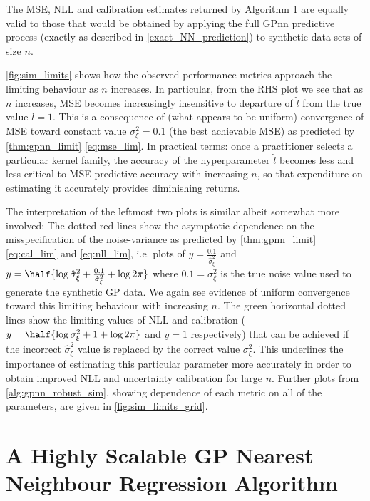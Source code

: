 \begin{lemma}
\label{lem:alg1}
The MSE, NLL and calibration estimates returned by Algorithm 1 are equally valid
to those that would be obtained by applying the full GPnn predictive process (exactly as described in \autoref{exact_NN_prediction}) to synthetic data sets of size $n$. 
\end{lemma}

\autoref{fig:sim_limits} shows how the observed performance metrics approach the limiting behaviour as \(n\) increases. In particular, from the RHS plot we see that as $n$ increases, MSE becomes increasingly insensitive to departure of $\hat{l}$ from the true value $l = 1$. This is a consequence of (what appears to be uniform) convergence of MSE toward constant value $\sigma_\xi^2 = 0.1$ (the best achievable MSE) as predicted by \autoref{thm:gpnn_limit} \ref{eq:mse_lim}. In practical terms: once a practitioner selects a particular kernel family, the accuracy of the hyperparameter $\hat{l}$ becomes less and less critical to MSE predictive accuracy with increasing $n$, so that expenditure on estimating it accurately provides diminishing returns.

The interpretation of the leftmost two plots is similar albeit somewhat more involved: The dotted red lines show the asymptotic dependence on the misspecification of the noise-variance as predicted by \autoref{thm:gpnn_limit} \ref{eq:cal_lim} and \ref{eq:nll_lim}, i.e. plots of $ y = \frac{0.1}{\hat{\sigma}_\xi^2}$ and $y =\half \{ \log\hat{\sigma}_\xi^2 + \frac{0.1}{\hat{\sigma}_\xi^2} +\log2\pi \} $ where $0.1 = \sigma_\xi^2$ is the true noise value used to generate the synthetic GP data.
We again see evidence of uniform convergence toward this limiting behaviour with increasing \(n\). The green horizontal dotted lines show the limiting values of NLL and calibration ($y =\half \{ \log\sigma_\xi^2 + 1 +\log2\pi \} $ and $y = 1$ respectively) that can be achieved if the incorrect $\hat{\sigma}_\xi^2$ value is replaced by the correct value $\sigma_\xi^2$. This underlines the importance of estimating this particular parameter more accurately in order to obtain improved NLL and uncertainty calibration for large $n$.
Further plots from \autoref{alg:gpnn_robust_sim}, showing dependence of each metric on all of the parameters, are given in \autoref{fig:sim_limits_grid}.

  

\section{A Highly Scalable GP Nearest Neighbour Regression Algorithm}
\label{simple_implementation}
